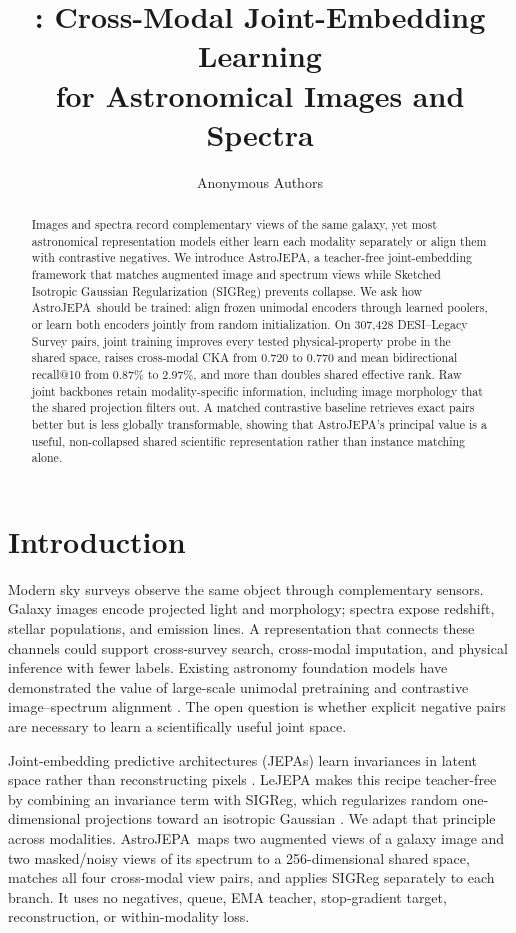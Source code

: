 \documentclass{article}
\title{\method: Cross-Modal Joint-Embedding Learning\\
for Astronomical Images and Spectra}
\author{Anonymous Authors}
\newcommand{\method}{AstroJEPA}
\begin{document}
\maketitle

\begin{abstract}
Images and spectra record complementary views of the same galaxy, yet most
astronomical representation models either learn each modality separately or
align them with contrastive negatives.
We introduce \method, a teacher-free joint-embedding framework that matches
augmented image and spectrum views while Sketched Isotropic Gaussian
Regularization (SIGReg) prevents collapse.
We ask how \method\ should be trained: align frozen unimodal encoders through
learned poolers, or learn both encoders jointly from random initialization.
On 307,428 DESI--Legacy Survey pairs, joint training improves every tested
physical-property probe in the shared space, raises cross-modal CKA from
0.720 to 0.770 and mean bidirectional recall@10 from 0.87\% to 2.97\%, and
more than doubles shared effective rank.
Raw joint backbones retain modality-specific information, including image
morphology that the shared projection filters out.
A matched contrastive baseline retrieves exact pairs better but is less
globally transformable, showing that \method's principal value is a useful,
non-collapsed shared scientific representation rather than instance matching
alone.
\end{abstract}

\section{Introduction}
\label{sec:intro}

Modern sky surveys observe the same object through complementary sensors.
Galaxy images encode projected light and morphology; spectra expose redshift,
stellar populations, and emission lines.
A representation that connects these channels could support cross-survey
search, cross-modal imputation, and physical inference with fewer labels.
Existing astronomy foundation models have demonstrated the value of large-scale
unimodal pretraining and contrastive image--spectrum alignment
\citep{parker2024astroclip,parker2025aion}.
The open question is whether explicit negative pairs are necessary to learn a
scientifically useful joint space.

Joint-embedding predictive architectures (JEPAs) learn invariances in latent
space rather than reconstructing pixels \citep{assran2023ijepa}.
LeJEPA makes this recipe teacher-free by combining an invariance term with
SIGReg, which regularizes random one-dimensional projections toward an
isotropic Gaussian \citep{balestriero2025lejepa}.
We adapt that principle across modalities.
\method\ maps two augmented views of a galaxy image and two masked/noisy views
of its spectrum to a 256-dimensional shared space, matches all four
cross-modal view pairs, and applies SIGReg separately to each branch.
It uses no negatives, queue, EMA teacher, stop-gradient target, reconstruction,
or within-modality loss.
\end{document}
